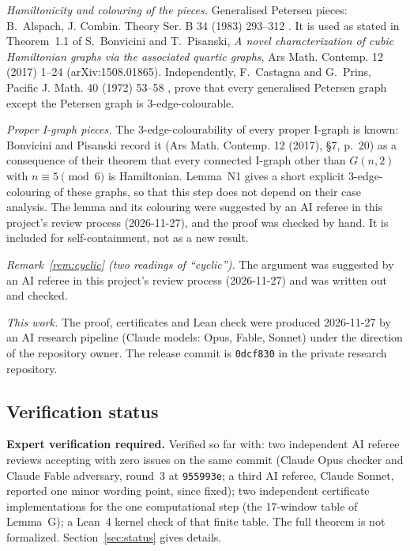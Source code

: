 \documentclass[11pt]{amsart}
\theoremstyle{plain}
\theoremstyle{definition}
\theoremstyle{remark}
\numberwithin{equation}{section}
\newcommand{\ttt}[1]{\texttt{#1}}
\begin{document}
\emph{Hamiltonicity and colouring of the pieces.} Generalised Petersen pieces: B.~Alspach, J. Combin. Theory Ser. B 34 (1983) 293--312 \cite{Als}. It is used as stated in Theorem~1.1 of S.~Bonvicini and T.~Pisanski, \emph{A novel characterization of cubic Hamiltonian graphs via the associated quartic graphs}, Ars Math. Contemp. 12 (2017) 1--24 \cite{BP} (arXiv:1508.01865). Independently, F.~Castagna and G.~Prins, Pacific J. Math. 40 (1972) 53--58 \cite{CP}, prove that every generalised Petersen graph except the Petersen graph is \(3\)-edge-colourable.

\emph{Proper I-graph pieces.} The \(3\)-edge-colourability of every proper I-graph is known: Bonvicini and Pisanski record it (Ars Math. Contemp. 12 (2017), \S7, p.~20) as a consequence of their theorem that every connected I-graph other than \(G(n,2)\) with \(n\equiv 5\pmod 6\) is Hamiltonian. Lemma~N1 gives a short explicit \(3\)-edge-colouring of these graphs, so that this step does not depend on their case analysis. The lemma and its colouring were suggested by an AI referee in this project's review process (2026-11-27), and the proof was checked by hand. It is included for self-containment, not as a new result.

\emph{Remark~\ref{rem:cyclic} (two readings of ``cyclic'').} The argument was suggested by an AI referee in this project's review process (2026-11-27) and was written out and checked.

\emph{This work.} The proof, certificates and Lean check were produced 2026-11-27 by an AI research pipeline (Claude models: Opus, Fable, Sonnet) under the direction of the repository owner. The release commit is \ttt{0dcf830} in the private research repository.

\subsection{Verification status}

\textbf{Expert verification required.} Verified so far with: two independent AI referee reviews accepting with zero issues on the same commit (Claude Opus checker and Claude Fable adversary, round~3 at \ttt{955993e}; a third AI referee, Claude Sonnet, reported one minor wording point, since fixed); two independent certificate implementations for the one computational step (the 17-window table of Lemma~G); a Lean~4 kernel check of that finite table. The full theorem is not formalized. Section~\ref{sec:status} gives details.

\end{document}
